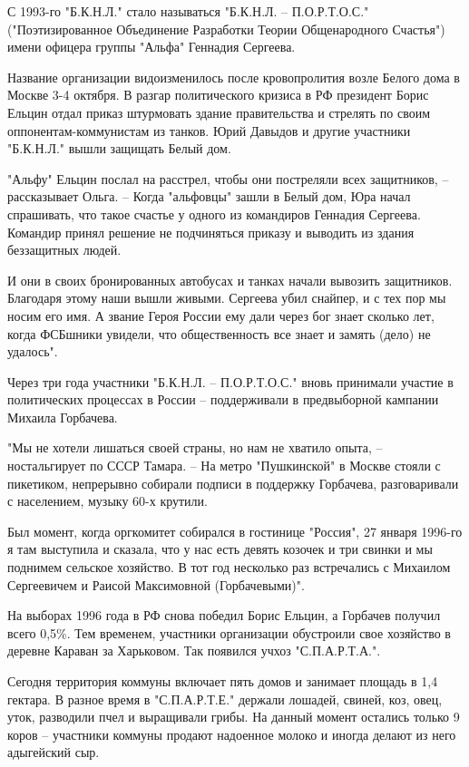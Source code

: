 С 1993-го "Б.К.Н.Л." стало называться "Б.К.Н.Л. – П.О.Р.Т.О.С."
("Поэтизированное Объединение Разработки Теории Общенародного Счастья") имени
офицера группы "Альфа" Геннадия Сергеева. 

Название организации видоизменилось после кровопролития возле Белого дома в
Москве 3-4 октября. В разгар политического кризиса в РФ президент Борис Ельцин
отдал приказ штурмовать здание правительства и стрелять по своим
оппонентам-коммунистам из танков. Юрий Давыдов и другие участники "Б.К.Н.Л."
вышли защищать Белый дом.

"Альфу" Ельцин послал на расстрел, чтобы они постреляли всех защитников, –
рассказывает Ольга. – Когда "альфовцы" зашли в Белый дом, Юра начал спрашивать,
что такое счастье у одного из командиров Геннадия Сергеева. Командир принял
решение не подчиняться приказу и выводить из здания беззащитных людей. 

И они в своих бронированных автобусах и танках начали вывозить защитников.
Благодаря этому наши вышли живыми. Сергеева убил снайпер, и с тех пор мы носим
его имя. А звание Героя России ему дали через бог знает сколько лет, когда
ФСБшники увидели, что общественность все знает и замять (дело) не удалось".

Через три года участники "Б.К.Н.Л. – П.О.Р.Т.О.С." вновь принимали участие в
политических процессах в России – поддерживали в предвыборной кампании Михаила
Горбачева.

"Мы не хотели лишаться своей страны, но нам не хватило опыта, – ностальгирует
по СССР Тамара. – На метро "Пушкинской" в Москве стояли с пикетиком, непрерывно
собирали подписи в поддержку Горбачева, разговаривали с населением, музыку 60-х
крутили. 

Был момент, когда оргкомитет собирался в гостинице "Россия", 27 января 1996-го
я там выступила и сказала, что у нас есть девять козочек и три свинки и мы
поднимем сельское хозяйство. В тот год несколько раз встречались с Михаилом
Сергеевичем и Раисой Максимовной (Горбачевыми)".

На выборах 1996 года в РФ снова победил Борис Ельцин, а Горбачев получил всего
0,5\%. Тем временем, участники организации обустроили свое хозяйство в деревне
Караван за Харьковом. Так появился учхоз "С.П.А.Р.Т.А.".

Сегодня территория коммуны включает пять домов и занимает площадь в 1,4
гектара. В разное время в "С.П.А.Р.Т.Е." держали лошадей, свиней, коз, овец,
уток, разводили пчел и выращивали грибы. На данный момент остались только 9
коров – участники коммуны продают надоенное молоко и иногда делают из него
адыгейский сыр.

